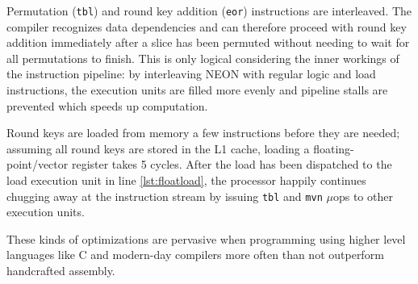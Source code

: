 Permutation (\texttt{tbl}) and round key addition (\texttt{eor}) instructions
are interleaved. The compiler recognizes data dependencies and can therefore
proceed with round key addition immediately after a slice has been permuted
without needing to wait for all permutations to finish. This is only logical
considering the inner workings of the instruction pipeline: by interleaving
NEON with regular logic and load instructions, the execution units are filled
more evenly and pipeline stalls are prevented which speeds up computation.

Round keys are loaded from memory a few instructions before they are needed;
assuming all round keys are stored in the L1 cache, loading a
floating-point/vector register takes 5 cycles. After the load has been
dispatched to the load execution unit in line \ref{lst:floatload}, the
processor happily continues chugging away at the instruction stream by issuing
\texttt{tbl} and \texttt{mvn} $\mu$ops to other execution units.

These kinds of optimizations are pervasive when programming using higher level
languages like C and modern-day compilers more often than not outperform
handcrafted assembly.
